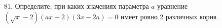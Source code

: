 81. Определите, при каких значениях параметра $a$ уравнение $(\sqrt{x}-2)(ax+2)(3x-2a)=0$ имеет ровно 2 различных корня.\\
